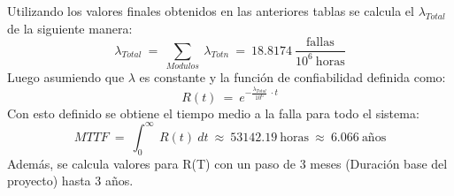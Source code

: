 Utilizando los valores finales obtenidos en las anteriores tablas se calcula el $\lambda_{Total}$ de la siguiente manera:
\begin{equation}
\lambda_{Total} \ = \  \sum_{Modulos} \  \lambda_{Totn}  \  =  \ 18.8174 \  \frac{\text{fallas}}{10^6 \ \text{horas}}
\end{equation}
Luego asumiendo que $\lambda$ es constante y la función de confiabilidad definida como:
\begin{equation}
R(t) \ = \ e^{-\frac{\lambda_{Total}}{10^6}\ \cdot t}
\end{equation}
Con esto definido se obtiene el tiempo medio a la falla para todo el sistema:
\begin{equation}
MTTF \ = \ \int_0^\infty \ R(t)\ dt \ \approx \ 53142.19 \ \text{horas} \ \approx \ 6.066 \ \text{años}
\end{equation}
Además, se calcula valores para R(T) con un paso de 3 meses (Duración base del proyecto) hasta 3 años.
